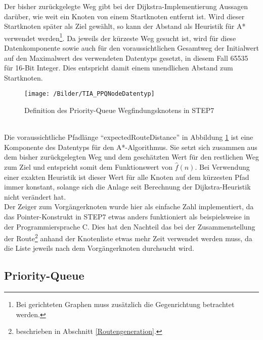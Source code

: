 			Der bisher zurückgelegte Weg gibt bei der Dijkstra-Implementierung Aussagen darüber, wie weit ein Knoten von einem Startknoten entfernt ist. Wird dieser Startknoten später als Ziel gewählt, so kann der Abstand als Heuristik für A* verwendet werden\footnote{Bei gerichteten Graphen muss zusätzlich die Gegenrichtung betrachtet werden.}. Da jeweils der kürzeste Weg gesucht ist, wird für diese Datenkomponente sowie auch für den voraussichtlichen Gesamtweg der Initialwert auf den Maximalwert des verwendeten Datentyps gesetzt, in diesem Fall 65535 für 16-Bit Integer. Dies entspricht damit einem unendlichen Abstand zum Startknoten.
			\\
			\begin{figure}[h]
				\centering
				\texttt{[image: /Bilder/TIA\_PPQNodeDatentyp]}
				\vspace{0.2cm}
				\caption{Definition des Priority-Queue Wegfindungsknotens in \ac{STEP7}}\label{PPQNode}
			\end{figure}
			\\
			Die voraussichtliche Pfadlänge "`expectedRouteDistance"' in Abbildung \ref{PPQNode} ist eine Komponente des Datentyps für den A*-Algorithmus. Sie setzt sich zusammen aus dem bisher zurückgelegten Weg und dem geschätzten Wert für den restlichen Weg zum Ziel und entspricht somit dem Funktionswert von $\hat{f}(n)$. Bei Verwendung einer exakten Heuristik ist dieser Wert für alle Knoten auf dem kürzesten Pfad immer konstant, solange sich die Anlage seit Berechnung der Dijkstra-Heuristik nicht verändert hat.
			\\[4pt]
			Der Zeiger zum Vorgängerknoten wurde hier als einfache Zahl implementiert, da das Pointer-Konstrukt in \ac{STEP7} etwas anders funktioniert als beispielsweise in der Programmiersprache C. Dies hat den Nachteil das bei der Zusammenstellung der Route\footnote{beschrieben in Abschnitt \ref{Routengeneration}.} anhand der Knotenliste etwas mehr Zeit verwendet werden muss, da die Liste jeweils nach dem Vorgängerknoten durchsucht wird.
		
		\subsection{Priority-Queue}
		
